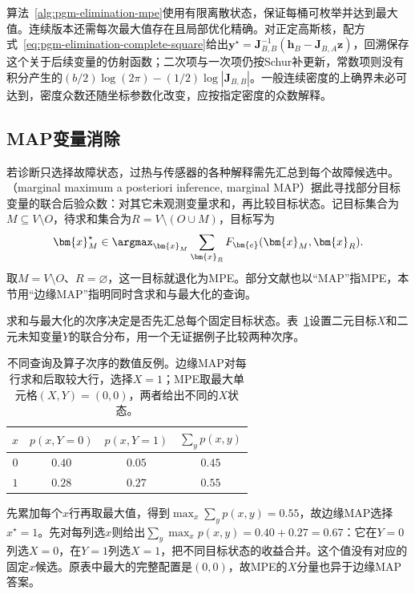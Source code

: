 算法~\ref{alg:pgm-elimination-mpe}使用有限离散状态，保证每桶可枚举并达到最大值。连续版本还需每次最大值存在且局部优化精确。对正定高斯核，配方式~\eqref{eq:pgm-elimination-complete-square}给出$\bm{y}^\star=\bm{J}_{B,B}^{-1}(\bm{h}_B-\bm{J}_{B,A}\bm{z})$，回溯保存这个关于后续变量的仿射函数；二次项与一次项仍按Schur补更新，常数项则没有积分产生的$(b/2)\log(2\pi)-(1/2)\log|\bm{J}_{B,B}|$。一般连续密度的上确界未必可达到，密度众数还随坐标参数化改变，应按指定密度的众数解释。

\subsection{MAP变量消除}
\label{sec:pgm-elimination-map}

若诊断只选择故障状态，过热与传感器的各种解释需先汇总到每个故障候选中。（marginal maximum a posteriori inference, marginal MAP）据此寻找部分目标变量的联合后验众数：对其它未观测变量求和，再比较目标状态。记目标集合为$M\subseteq V\setminus O$，待求和集合为$R=V\setminus(O\cup M)$，目标写为
\begin{equation}
  \bm{x}_M^\star
  \in\argmax_{\bm{x}_M}\sum_{\bm{x}_R}
       F_{\bm{e}}(\bm{x}_M,\bm{x}_R).
  \label{eq:pgm-elimination-map-objective}
\end{equation}
取$M=V\setminus O$、$R=\varnothing$，这一目标就退化为MPE。部分文献也以“MAP”指MPE，本节用“边缘MAP”指明同时含求和与最大化的查询。

求和与最大化的次序决定是否先汇总每个固定目标状态。表~\ref{tab:pgm-elimination-map-counterexample}设置二元目标$X$和二元未知变量$Y$的联合分布，用一个无证据例子比较两种次序。

\begin{table}[htbp]
  \centering
  \begin{tabular}{cccc}
    \toprule
    $x$ & $p(x,Y=0)$ & $p(x,Y=1)$ & $\sum_y p(x,y)$\\
    \midrule
    $0$ & $0.40$ & $0.05$ & $0.45$\\
    $1$ & $0.28$ & $0.27$ & $0.55$\\
    \bottomrule
  \end{tabular}
  \caption{不同查询及算子次序的数值反例。边缘MAP对每行求和后取较大行，选择$X=1$；MPE取最大单元格$(X,Y)=(0,0)$，两者给出不同的$X$状态。}
  \label{tab:pgm-elimination-map-counterexample}
\end{table}

先累加每个$x$行再取最大值，得到$\max_x\sum_y p(x,y)=0.55$，故边缘MAP选择$x^\star=1$。先对每列选$x$则给出$\sum_y\max_x p(x,y)=0.40+0.27=0.67$：它在$Y=0$列选$X=0$，在$Y=1$列选$X=1$，把不同目标状态的收益合并。这个值没有对应的固定$x$候选。原表中最大的完整配置是$(0,0)$，故MPE的$X$分量也异于边缘MAP答案。

